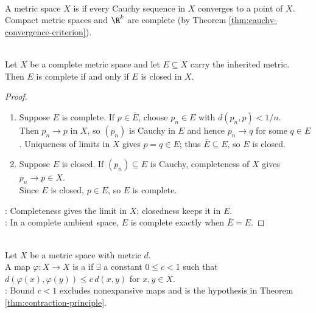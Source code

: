 \begin{definition} \label{def:complete-metric-space} \\
A metric space $X$ is  if every Cauchy sequence in $X$ converges to a point of $X$.\\
Compact metric spaces and $\R^k$ are complete (by Theorem \ref{thm:cauchy-convergence-criterion}).
\end{definition}

\begin{proposition} \label{prop:basic-completeness-consequences} \\
Let $X$ be a complete metric space and let $E\subseteq X$ carry the inherited metric.\\
Then $E$ is complete if and only if $E$ is closed in $X$.
\begin{proof}
\begin{enumerate}[label=\roman*.]
\setlength{\itemsep}{0pt}
\item[$(\Rightarrow)$] Suppose $E$ is complete. If $p\in\overline{E}$, choose $p_n\in E$ with $d(p_n,p)<1/n$.\\
Then $p_n\to p$ in $X$, so $(p_n)$ is Cauchy in $E$ and hence $p_n\to q$ for some $q\in E$. Uniqueness of limits in $X$ gives $p=q\in E$; thus $\overline{E}\subseteq E$, so $E$ is closed.
\item[$(\Leftarrow)$] Suppose $E$ is closed. If $(p_n)\subseteq E$ is Cauchy, completeness of $X$ gives $p_n\to p\in X$.\\
Since $E$ is closed, $p\in E$, so $E$ is complete.
\end{enumerate}
: Completeness gives the limit in $X$; closedness keeps it in $E$.\\
: In a complete ambient space, $E$ is complete exactly when $\overline{E}=E$.
\end{proof}
\end{proposition}

\begin{definition} \label{def:contraction-mapping} \\
Let $X$ be a metric space with metric $d$.\\
A map $\varphi:X\to X$ is a  if $\exists$ a constant $0\leq c<1$ such that $d(\varphi(x),\varphi(y))\leq c\,d(x,y)$ for $x,y\in X$.\\
: Bound $c<1$ excludes nonexpansive maps and is the hypothesis in Theorem \ref{thm:contraction-principle}.
\end{definition}

